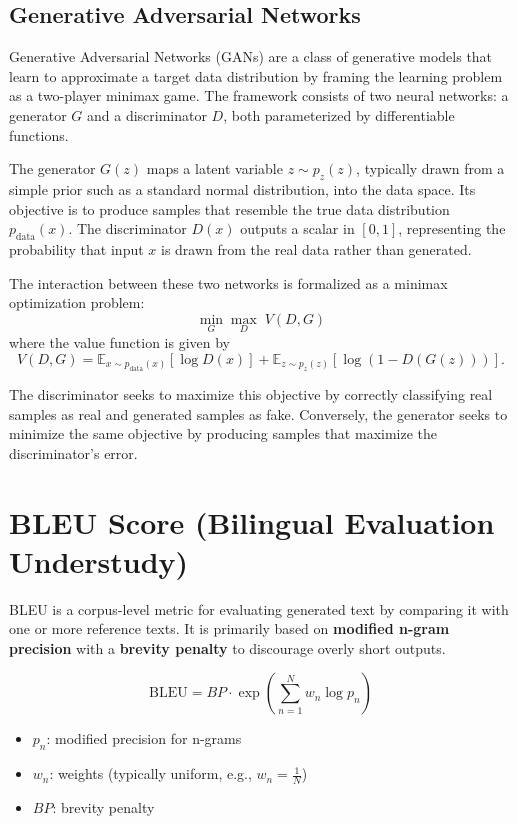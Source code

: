 \documentclass[10pt,a4paper]{article}
\begin{document}
\subsection{Generative Adversarial Networks}

Generative Adversarial Networks (GANs) are a class of generative models that learn to approximate a target data distribution by framing the learning problem as a two-player minimax game. The framework consists of two neural networks: a generator \(G\) and a discriminator \(D\), both parameterized by differentiable functions.

The generator \(G(z)\) maps a latent variable \(z \sim p_z(z)\), typically drawn from a simple prior such as a standard normal distribution, into the data space. Its objective is to produce samples that resemble the true data distribution \(p_{\text{data}}(x)\). The discriminator \(D(x)\) outputs a scalar in \([0,1]\), representing the probability that input \(x\) is drawn from the real data rather than generated.

The interaction between these two networks is formalized as a minimax optimization problem:
\[
\min_G \max_D \; V(D,G)
\]
where the value function is given by
\[
V(D,G) = \mathbb{E}_{x \sim p_{\text{data}}(x)}[\log D(x)] + \mathbb{E}_{z \sim p_z(z)}[\log(1 - D(G(z)))].
\]

The discriminator seeks to maximize this objective by correctly classifying real samples as real and generated samples as fake. Conversely, the generator seeks to minimize the same objective by producing samples that maximize the discriminator's error.


\section{BLEU Score (Bilingual Evaluation Understudy)}

BLEU is a corpus-level metric for evaluating generated text by comparing it with one or more reference texts. It is primarily based on \textbf{modified n-gram precision} with a \textbf{brevity penalty} to discourage overly short outputs.


\[
\text{BLEU} = BP \cdot \exp \left( \sum_{n=1}^{N} w_n \log p_n \right)
\]

\begin{itemize}
    \item $p_n$: modified precision for n-grams
    \item $w_n$: weights (typically uniform, e.g., $w_n = \frac{1}{N}$)
    \item $BP$: brevity penalty
\end{itemize}
\end{document}
